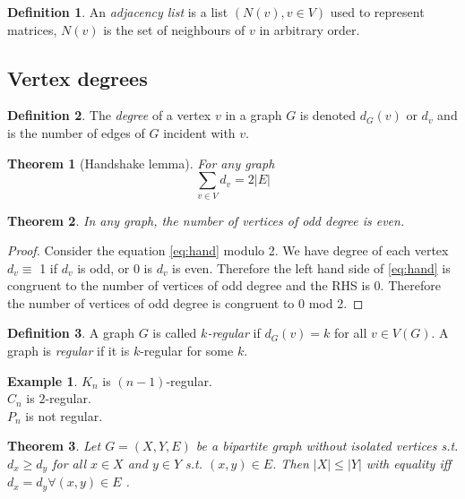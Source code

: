 \documentclass{article}
\newtheorem*{thm}{Theorem}
\theoremstyle{definition}
\newtheorem*{defn}{Definition}
\newtheorem*{ex}{Example}
\begin{document}
\begin{defn}
An \emph{adjacency list} is a list $(N(v),v\in V)$ used to represent matrices, $N(v)$ is the set of neighbours of $v$ in arbitrary order.
\end{defn}

\subsection{Vertex degrees}

\begin{defn}
The \emph{degree} of a vertex $v$ in a graph $G$ is denoted $d_G(v)$ or $d_v$ and is the number of edges of $G$ incident with $v$.
\end{defn}

\begin{thm}[Handshake lemma]
For any graph
\begin{equation} \label{eq:hand}
\sum_{v\in V}d_v = 2|E|
\end{equation}
\end{thm}

\begin{thm}
In any graph, the number of vertices of odd degree is even.
\end{thm}

\begin{proof}
Consider the equation \ref{eq:hand} modulo 2.
We have degree of each vertex $d_v \equiv$ 1 if $d_v$ is odd, or 0 is $d_v$ is even.
Therefore the left hand side of \ref{eq:hand} is congruent to the number of vertices of odd degree and the RHS is 0.
Therefore the number of vertices of odd degree is congruent to 0 mod 2.
\end{proof}

\begin{defn}
A graph $G$ is called \emph{$k$-regular} if $d_G(v) = k$ for all $v\in V(G)$.
A graph is \emph{regular} if it is $k$-regular for some $k$.
\end{defn}

\begin{ex}
$K_n$ is $(n-1)$-regular. \\
$C_n$ is $2$-regular. \\
$P_n$ is not regular. \\
\end{ex}


\begin{thm}
Let $G=(X,Y,E)$ be a bipartite graph without isolated vertices s.t. $d_x\geq d_y$ for all $x\in X$ and $y\in Y$ s.t. $(x,y)\in E$.
Then $|X| \leq |Y|$ with equality iff $d_x = d_y \forall (x,y)\in E$ .
\end{thm}
\end{document}

